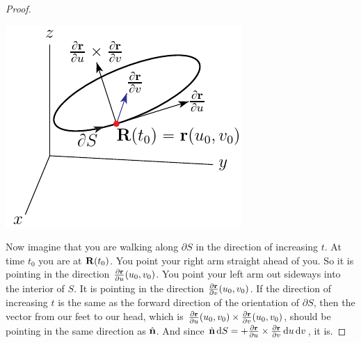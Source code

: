 \begin{proof}
\begin{wfig}
\begin{center}
    \includegraphics{stokes3.pdf}
\end{center}
\end{wfig}


Now imagine that you are walking along $\partial S$ in the direction of
increasing $t$. At time $t_0$ you are at $\mathbf{R}(t_0)$. You point your right arm
straight ahead of you. So it is pointing in the direction
$\frac{\partial \mathbf{r}}{\partial u}(u_0,v_0)$. You point your left arm
out sideways into the interior of $S$. It is pointing in the 
direction $\frac{\partial \mathbf{r}}{\partial v}(u_0,v_0)$. If the direction
of increasing $t$ is the same as the forward direction of the orientation
of $\partial S$, then the vector from our feet to our head, which is 
$\frac{\partial \mathbf{r}}{\partial u}(u_0,v_0)
\times \frac{\partial \mathbf{r}}{\partial v}(u_0,v_0)$, should be pointing in
the same direction as $\hat{\mathbf{n}}$. And since 
$\hat{\mathbf{n}}\,\mathrm{d}S = +\frac{\partial \mathbf{r}}{\partial u}
     \times \frac{\partial \mathbf{r}}{\partial v}\,\mathrm{d}u\,\mathrm{d}v$, it is.


\end{proof}
